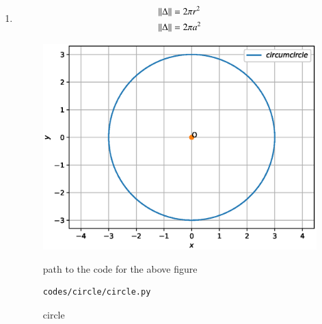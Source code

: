 \renewcommand{\theequation}{\theenumi}
\begin{enumerate}[label=\arabic*.,ref=\thesubsection.\theenumi]

\item 
\begin{align}
\left\lVert\Delta\right\rVert &= 2\pi r^2
\\
\left\lVert\Delta\right\rVert &= 2\pi a^2
\end{align}
\begin{figure}[!ht]
\centering
\includegraphics[width=\columnwidth]{./figures/circle/circle.eps}
\caption{circle }
\label{fig:circle}
path to the code for the above figure
\begin{lstlisting}
codes/circle/circle.py
\end{lstlisting}
\end{figure}


\end{enumerate}